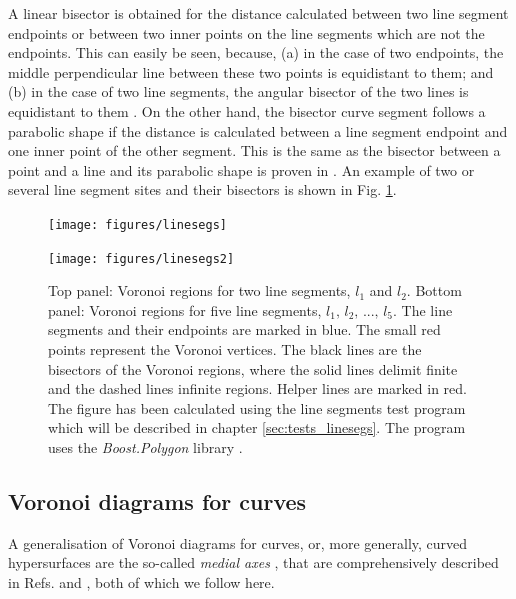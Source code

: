 A linear bisector is obtained for the distance calculated between two line segment endpoints or between two inner 
points on the line segments which are not the endpoints.
This can easily be seen, because, (a) in the case of two endpoints, the middle perpendicular line between these 
two points is equidistant to them; and (b) in the case of two line segments, the angular bisector of the two lines is
equidistant to them \cite[Ch. 5.4.2, pp. 243-244]{FUH_geo2020}.
On the other hand, the bisector curve segment follows a parabolic shape if the distance is calculated 
between a line segment endpoint and one inner point of the other segment. This is the same as the bisector between
a point and a line and its parabolic shape is proven in \cite[Ch. 5, pp. 260-261]{FUH_geo2020}.
An example of two or several line segment sites and their bisectors is shown in Fig. \ref{fig:linesegs_voro}.

\begin{figure}[H]
	\begin{minipage}{1 \textwidth}
		\begin{center}
			\texttt{[image: figures/linesegs]}
		\end{center}
		\vspace{0.5cm}
	\end{minipage}
	\begin{minipage}{1 \textwidth}
		\vspace{0.25cm}
		\begin{center}
			\texttt{[image: figures/linesegs2]}
		\end{center}
	\end{minipage}
	\caption[Voronoi diagrams for line segments.]{
		Top panel: Voronoi regions for two line segments, $l_1$ and $l_2$.
		Bottom panel: Voronoi regions for five line segments, $l_1,\, l_2,\, ...,\, l_5$.
		The line segments and their endpoints are marked in blue. The small red points represent the Voronoi vertices.
		The black lines are the bisectors of the Voronoi regions, where the solid lines delimit finite and the dashed lines
		infinite regions. Helper lines are marked in red. The figure has been calculated using the line segments
		test program which will be described in chapter \ref{sec:tests_linesegs}. The program uses 
		the \textit{Boost.Polygon} library \cite{web_boost_polygon_voronoi}.
		\label{fig:linesegs_voro}}
\end{figure}




\subsection{Voronoi diagrams for curves}
\label{sec:voro_median}
A generalisation of Voronoi diagrams for curves, or, more generally, curved hypersurfaces are the so-called 
\textit{medial axes} \cite{wiki_medial}, that are comprehensively described in 
Refs. \cite[pp. 109-114]{Boissonnat2006} and \cite[pp. 244-252]{Cazals2006}, both of which we follow here.

